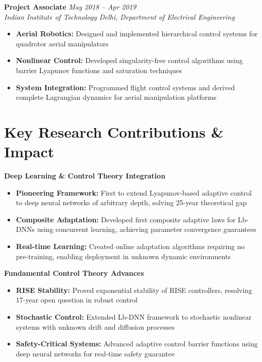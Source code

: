 \documentclass[10pt, letterpaper]{article}
\begin{document}
\textbf{Project Associate} \hfill \textit{May 2018 -- Apr 2019}\\
\textit{Indian Institute of Technology Delhi, Department of Electrical Engineering}
\begin{itemize}[leftmargin=20pt, itemsep=1pt]
    \item \textbf{Aerial Robotics:} Designed and implemented hierarchical control systems for quadrotor aerial manipulators
    \item \textbf{Nonlinear Control:} Developed singularity-free control algorithms using barrier Lyapunov functions and saturation techniques
    \item \textbf{System Integration:} Programmed flight control systems and derived complete Lagrangian dynamics for aerial manipulation platforms
\end{itemize}

\section{Key Research Contributions \& Impact}

\textbf{Deep Learning \& Control Theory Integration}
\begin{itemize}[leftmargin=20pt, itemsep=1pt]
    \item \textbf{Pioneering Framework:} First to extend Lyapunov-based adaptive control to deep neural networks of arbitrary depth, solving 25-year theoretical gap
    \item \textbf{Composite Adaptation:} Developed first composite adaptive laws for Lb-DNNs using concurrent learning, achieving parameter convergence guarantees
    \item \textbf{Real-time Learning:} Created online adaptation algorithms requiring no pre-training, enabling deployment in unknown dynamic environments
\end{itemize}

\textbf{Fundamental Control Theory Advances}
\begin{itemize}[leftmargin=20pt, itemsep=1pt]
    \item \textbf{RISE Stability:} Proved exponential stability of RISE controllers, resolving 17-year open question in robust control
    \item \textbf{Stochastic Control:} Extended Lb-DNN framework to stochastic nonlinear systems with unknown drift and diffusion processes
    \item \textbf{Safety-Critical Systems:} Advanced adaptive control barrier functions using deep neural networks for real-time safety guarantee
\end{itemize}
\end{document}
